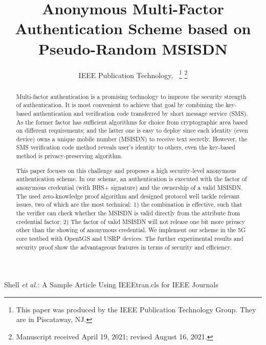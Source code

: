 \documentclass[lettersize,journal]{IEEEtran}
\begin{document}
\title{Anonymous Multi-Factor Authentication Scheme based on Pseudo-Random MSISDN}

\author{IEEE Publication Technology,~
\thanks{This paper was produced by the IEEE Publication Technology Group. They are in Piscataway, NJ.}%
\thanks{Manuscript received April 19, 2021; revised August 16, 2021.}}

%
{Shell \MakeLowercase{\textit{et al.}}: A Sample Article Using IEEEtran.cls for IEEE Journals}


\maketitle

\begin{abstract}
Multi-factor authentication is a promising technology to improve the security strength of authentication. It is most convenient to achieve that goal by combining the key-based authentication and verification code transferred by short message service (SMS). As the former factor has sufficient algorithms for choice from cryptographic area based on different requirements; and the latter one is easy to deploy since each identity (even device) owns a unique mobile number (MSISDN) to receive text secretly. However, the SMS verification code method reveals user's identity to others, even the key-based method is privacy-preserving algorithm.

This paper focuses on this challenge and proposes a high security-level anonymous authentication scheme. In our scheme, an authentication is executed with the factor of anonymous credential (with BBS+ signature) and the ownership of a valid MSISDN. The used zero-knowledge proof algorithm and designed protocol well tackle relevant issues, two of which are the most technical: 1) the combination is effective, such that the verifier can check whether the MSISDN is valid directly from the attribute from credential factor; 2) The factor of valid MSISDN will not release one bit more privacy other than the showing of anonymous credential. We implement our scheme in the 5G core testbed with Open5GS and USRP devices. The further experimental results and security proof show the advantageous features in terms of security and efficiency.
\end{abstract}
\end{document}
